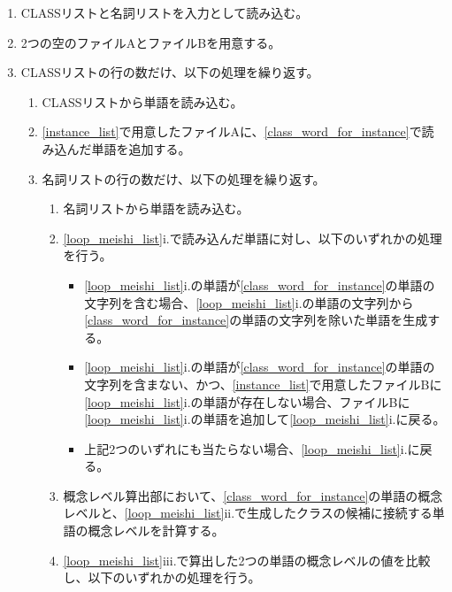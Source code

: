 \begin{enumerate}
    \item CLASSリストと名詞リストを入力として読み込む。
    \item 2つの空のファイルAとファイルBを用意する。
    \label{instance_list}
    \item CLASSリストの行の数だけ、以下の処理を繰り返す。
        \begin{enumerate}
            \item CLASSリストから単語を読み込む。
            \label{class_word_for_instance}
            \item \ref{instance_list}で用意したファイルAに、\ref{class_word_for_instance}で読み込んだ単語を追加する。
            \label{instance_list2}
            \item 名詞リストの行の数だけ、以下の処理を繰り返す。
            \label{loop_meishi_list}
                \begin{enumerate}
                    \item 名詞リストから単語を読み込む。
                    \label{meishi_word}
                    \item \ref{loop_meishi_list}i.で読み込んだ単語に対し、以下のいずれかの処理を行う。
                        \begin{itemize}
                            \item \ref{loop_meishi_list}i.の単語が\ref{class_word_for_instance}の単語の文字列を含む場合、\ref{loop_meishi_list}i.の単語の文字列から\ref{class_word_for_instance}の単語の文字列を除いた単語を生成する。
                            \label{remove_class_word}
                            \item \ref{loop_meishi_list}i.の単語が\ref{class_word_for_instance}の単語の文字列を含まない、かつ、\ref{instance_list}で用意したファイルBに\ref{loop_meishi_list}i.の単語が存在しない場合、ファイルBに\ref{loop_meishi_list}i.の単語を追加して\ref{loop_meishi_list}i.に戻る。
                            \item 上記2つのいずれにも当たらない場合、\ref{loop_meishi_list}i.に戻る。
                        \end{itemize}
                    \item 概念レベル算出部において、\ref{class_word_for_instance}の単語の概念レベルと、\ref{loop_meishi_list}ii.で生成したクラスの候補に接続する単語の概念レベルを計算する。
                    \label{calc_concept_class_meishi}
                    \item \ref{loop_meishi_list}iii.で算出した2つの単語の概念レベルの値を比較し、以下のいずれかの処理を行う。

\end{enumerate}
\end{enumerate}
\end{enumerate}
